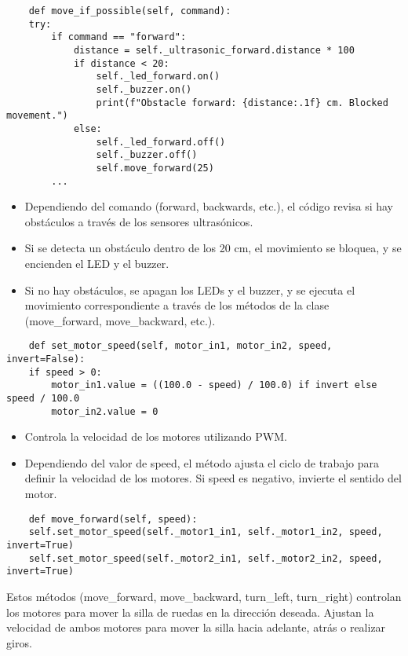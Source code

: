 \documentclass{article}
\begin{document}
\begin{lstlisting}
    def move_if_possible(self, command):
    try:
        if command == "forward": 
            distance = self._ultrasonic_forward.distance * 100
            if distance < 20:
                self._led_forward.on()
                self._buzzer.on()
                print(f"Obstacle forward: {distance:.1f} cm. Blocked movement.")
            else:
                self._led_forward.off()
                self._buzzer.off()
                self.move_forward(25)
        ...
\end{lstlisting}
\begin{itemize}
    \item Dependiendo del comando (forward, backwards, etc.), el código revisa si hay obstáculos a través de los sensores ultrasónicos.
    \item Si se detecta un obstáculo dentro de los 20 cm, el movimiento se bloquea, y se encienden el LED y el buzzer.
    \item Si no hay obstáculos, se apagan los LEDs y el buzzer, y se ejecuta el movimiento correspondiente a través de los métodos de la clase (move\_forward, move\_backward, etc.).
\end{itemize}

\begin{lstlisting}
    def set_motor_speed(self, motor_in1, motor_in2, speed, invert=False):
    if speed > 0:
        motor_in1.value = ((100.0 - speed) / 100.0) if invert else speed / 100.0
        motor_in2.value = 0
\end{lstlisting}
\begin{itemize}
    \item Controla la velocidad de los motores utilizando PWM.
    \item Dependiendo del valor de speed, el método ajusta el ciclo de trabajo para definir la velocidad de los motores. Si speed es negativo, invierte el sentido del motor.
\end{itemize}

\begin{lstlisting}
    def move_forward(self, speed):
    self.set_motor_speed(self._motor1_in1, self._motor1_in2, speed, invert=True)
    self.set_motor_speed(self._motor2_in1, self._motor2_in2, speed, invert=True)
\end{lstlisting}
Estos métodos (move\_forward, move\_backward, turn\_left, turn\_right) controlan los motores para mover la silla de ruedas en la dirección deseada.
Ajustan la velocidad de ambos motores para mover la silla hacia adelante, atrás o realizar giros.
\end{document}
